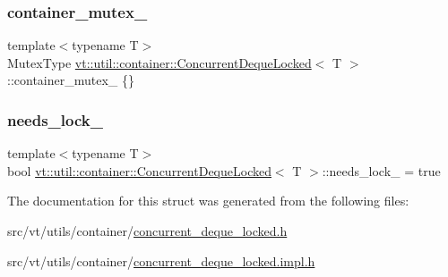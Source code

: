 \mbox{\label{structvt_1_1util_1_1container_1_1_concurrent_deque_locked_a04471e3de55c89728013825b6e64e453}} 
\subsubsection{\texorpdfstring{container\+\_\+mutex\+\_\+}{container\_mutex\_}}
{\footnotesize\ttfamily template$<$typename T$>$ \\
Mutex\+Type \hyperlink{structvt_1_1util_1_1container_1_1_concurrent_deque_locked}{vt\+::util\+::container\+::\+Concurrent\+Deque\+Locked}$<$ T $>$\+::container\+\_\+mutex\+\_\+ \{\}\hspace{0.3cm}{\ttfamily [private]}}

\mbox{\label{structvt_1_1util_1_1container_1_1_concurrent_deque_locked_af681c689f7800fca7e35364aeffd9964}} 
\subsubsection{\texorpdfstring{needs\+\_\+lock\+\_\+}{needs\_lock\_}}
{\footnotesize\ttfamily template$<$typename T$>$ \\
bool \hyperlink{structvt_1_1util_1_1container_1_1_concurrent_deque_locked}{vt\+::util\+::container\+::\+Concurrent\+Deque\+Locked}$<$ T $>$\+::needs\+\_\+lock\+\_\+ = true\hspace{0.3cm}{\ttfamily [private]}}



The documentation for this struct was generated from the following files\+:\begin{DoxyCompactItemize}
\item 
src/vt/utils/container/\hyperlink{concurrent__deque__locked_8h}{concurrent\+\_\+deque\+\_\+locked.\+h}\item 
src/vt/utils/container/\hyperlink{concurrent__deque__locked_8impl_8h}{concurrent\+\_\+deque\+\_\+locked.\+impl.\+h}\end{DoxyCompactItemize}
